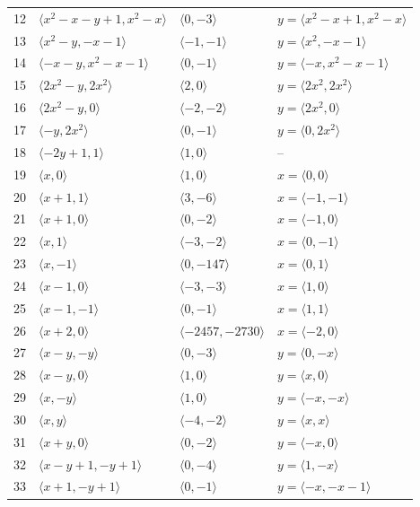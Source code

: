\documentclass[11pt]{article}
\begin{document}
\begin{longtable}{@{}rlll@{}}
12 & $\langle x^{2}-x-y+1,x^{2}-x\rangle$ & $\langle 0,-3\rangle$ & $y=\langle x^{2}-x+1,x^{2}-x\rangle$\\
13 & $\langle x^{2}-y,-x-1\rangle$ & $\langle -1,-1\rangle$ & $y=\langle x^{2},-x-1\rangle$\\
14 & $\langle -x-y,x^{2}-x-1\rangle$ & $\langle 0,-1\rangle$ & $y=\langle -x,x^{2}-x-1\rangle$\\
15 & $\langle 2x^{2}-y,2x^{2}\rangle$ & $\langle 2,0\rangle$ & $y=\langle 2x^{2},2x^{2}\rangle$\\
16 & $\langle 2x^{2}-y,0\rangle$ & $\langle -2,-2\rangle$ & $y=\langle 2x^{2},0\rangle$\\
17 & $\langle -y,2x^{2}\rangle$ & $\langle 0,-1\rangle$ & $y=\langle 0,2x^{2}\rangle$\\
18 & $\langle -2y+1,1\rangle$ & $\langle 1,0\rangle$ & --\\
19 & $\langle x,0\rangle$ & $\langle 1,0\rangle$ & $x=\langle 0,0\rangle$\\
20 & $\langle x+1,1\rangle$ & $\langle 3,-6\rangle$ & $x=\langle -1,-1\rangle$\\
21 & $\langle x+1,0\rangle$ & $\langle 0,-2\rangle$ & $x=\langle -1,0\rangle$\\
22 & $\langle x,1\rangle$ & $\langle -3,-2\rangle$ & $x=\langle 0,-1\rangle$\\
23 & $\langle x,-1\rangle$ & $\langle 0,-147\rangle$ & $x=\langle 0,1\rangle$\\
24 & $\langle x-1,0\rangle$ & $\langle -3,-3\rangle$ & $x=\langle 1,0\rangle$\\
25 & $\langle x-1,-1\rangle$ & $\langle 0,-1\rangle$ & $x=\langle 1,1\rangle$\\
26 & $\langle x+2,0\rangle$ & $\langle -2457,-2730\rangle$ & $x=\langle -2,0\rangle$\\
27 & $\langle x-y,-y\rangle$ & $\langle 0,-3\rangle$ & $y=\langle 0,-x\rangle$\\
28 & $\langle x-y,0\rangle$ & $\langle 1,0\rangle$ & $y=\langle x,0\rangle$\\
29 & $\langle x,-y\rangle$ & $\langle 1,0\rangle$ & $y=\langle -x,-x\rangle$\\
30 & $\langle x,y\rangle$ & $\langle -4,-2\rangle$ & $y=\langle x,x\rangle$\\
31 & $\langle x+y,0\rangle$ & $\langle 0,-2\rangle$ & $y=\langle -x,0\rangle$\\
32 & $\langle x-y+1,-y+1\rangle$ & $\langle 0,-4\rangle$ & $y=\langle 1,-x\rangle$\\
33 & $\langle x+1,-y+1\rangle$ & $\langle 0,-1\rangle$ & $y=\langle -x,-x-1\rangle$\\

\end{longtable}
\end{document}
